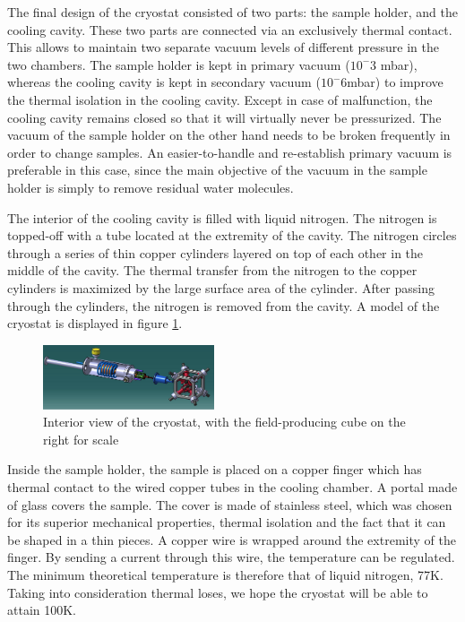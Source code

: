 \documentclass[journal]{IEEEtran}
\begin{document}
The final design of the cryostat consisted of two parts: the sample holder, and the cooling cavity. These two parts are connected via an exclusively thermal contact. This allows to maintain two separate vacuum levels of different pressure in the two chambers. The sample holder is kept in primary vacuum ($10^-3$ mbar), whereas the cooling cavity is kept in secondary vacuum ($10^-6$mbar) to improve the thermal isolation in the cooling cavity. Except in case of malfunction, the cooling cavity remains closed so that it will virtually never be pressurized. The vacuum of the sample holder on the other hand needs to be broken frequently in order to change samples. An easier-to-handle and re-establish primary vacuum is preferable in this case, since the main objective of the vacuum in the sample holder is simply to remove residual water molecules.

The interior of the cooling cavity is filled with liquid nitrogen. The nitrogen is topped-off with a tube located at the extremity of the cavity. The nitrogen circles through a series of thin copper cylinders layered on top of each other in the middle of the cavity.  The thermal transfer from the nitrogen to the copper cylinders is maximized by the large surface area of the cylinder. After passing through the cylinders, the nitrogen is removed from the cavity. A model of the cryostat is displayed in figure \ref{f cryostat}.

\begin{figure}[h]
\centering
\includegraphics[width=0.45\textwidth]{Cryo_1.jpg}
\caption{Interior view of the cryostat, with the field-producing cube on the right for scale}
\label{f cryostat}
\end{figure}

Inside the sample holder, the sample is placed on a copper finger which has thermal contact to the wired copper tubes in the cooling chamber. A portal made of glass covers the sample. The cover is made of stainless steel, which was chosen for its superior mechanical properties, thermal isolation and the fact that it can be shaped in a thin pieces. A copper wire is wrapped around the extremity of the finger. By sending a current through this wire, the temperature can be regulated. The minimum theoretical temperature is therefore that of liquid nitrogen, 77K. Taking into consideration thermal loses, we hope the cryostat will be able to attain 100K.
\end{document}
